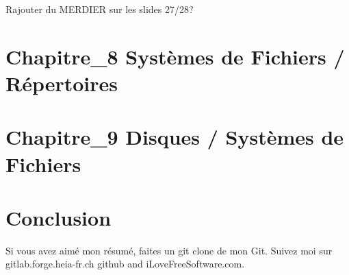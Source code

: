 Rajouter du MERDIER sur les slides 27/28?






\newpage
\section{Chapitre\_8 Systèmes de Fichiers / Répertoires}

















\newpage
\section{Chapitre\_9 Disques / Systèmes de Fichiers}














































\newpage
\section{Conclusion}
Si vous avez aimé mon résumé, faites un git clone de mon Git. Suivez moi sur gitlab.forge.heia-fr.ch github and iLoveFreeSoftware.com.


